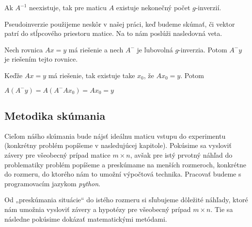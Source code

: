 \begin{com}
Ak $A^{-1}$ neexistuje, tak pre maticu $A$ existuje nekonečný počet $g$-inverzií.
\end{com}

Pseudoinverzie použijeme neskôr v našej práci, keď budeme skúmať, 
či vektor patrí do stĺpcového priestoru matice. Na to nám poslúži nasledovná veta.

\begin{theorem}
\label{veta3}
Nech rovnica $Ax = y$ má riešenie a nech $A^-$ je ľubovolná $g$-inverzia. Potom $A^- y$ je riešením tejto rovnice.
\end{theorem}

\begin{dokaz}
Keďže $Ax = y$ má riešenie, tak existuje take $x_0$, že $A x_0 = y$. Potom 
\begin{center}
$A (A^- y) = A(A^- A x_0) = A x_0 = y$
\end{center}
\end{dokaz}

\subsection{Metodika skúmania}

Cieľom nášho skúmania bude nájsť ideálnu maticu vstupu do experimentu (konkrétny problém popíšeme v nasledujúcej kapitole). 
Pokúsime sa vysloviť závery pre všeobecný prípad matice $m \times n$,
avšak pre istý prvotný náhľad do problematiky problém popíšeme a preskúmame na menších rozmeroch, 
konkrétne do rozmeru, do ktorého nám to umožní výpočtová technika. Pracovať budeme s programovacím jazykom \textit{python}.

Od „preskúmania situácie“ do istého rozmeru si sľubujeme dôležité náhľady, 
ktoré nám umožnia vysloviť závery a hypotézy pre všeobecný prípad $m \times n$. 
Tie sa následne pokúsime dokázať matematickými metódami.
